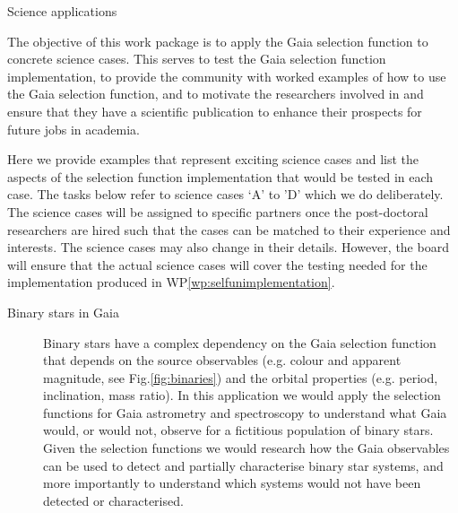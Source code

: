 \begin{workpackage}{Science applications}
  \label{wp:scienceappl}
  \wpend{\duration} %

  \makewptable %

  \begin{wpobjectives}
    The objective of this work package is to apply the Gaia selection function to concrete science cases. This serves to test the Gaia selection function implementation, to provide the community with worked examples of how to use the Gaia selection function, and to motivate the researchers involved in {\acro} and ensure that they have a scientific publication to enhance their prospects for future jobs in academia.
    
    Here we provide examples that represent exciting science cases and list the aspects of the selection function implementation that would be tested in each case. The tasks below refer to science cases `A' to 'D' which we do deliberately. The science cases will be assigned to specific {\acro} partners once the post-doctoral researchers are hired such that the cases can be matched to their experience and interests. The science cases may also change in their details. However, the {\acro} board will ensure that the actual science cases will cover the testing needed for the implementation produced in WP\ref{wp:selfunimplementation}.
    
    \begin{description}
      \item[Binary stars in Gaia] {
        Binary stars have a complex dependency on the Gaia selection function that depends on the source observables (e.g. colour and apparent magnitude, see Fig.\ref{fig:binaries}) and the orbital properties (e.g. period, inclination, mass ratio). In this application we would apply the selection functions for Gaia astrometry and spectroscopy to understand what Gaia would, or would not, observe for a fictitious population of binary stars. Given the selection functions we would research how the Gaia observables can be used to detect and partially characterise binary star systems, and more importantly to understand which systems would not have been detected or characterised. 

}
\end{description}
\end{wpobjectives}
\end{workpackage}
